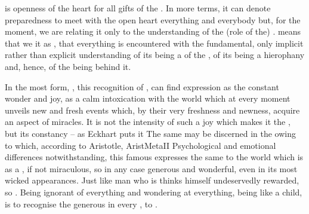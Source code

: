 \pa {} is openness of the heart for all gifts of the
. In more  terms, it can denote preparedness to meet
with the open heart everything and everybody but, for the moment, we are relating
it only to the understanding of the (role of the) .  means that we
 it as , that everything is encountered with the
fundamental, only implicit rather than explicit understanding of its being a
 of the 
, of its being a hierophany and, hence, of the  being
 behind it. 

In the most  form, , this recognition of
, can find expression as the constant wonder and joy, as a calm
intoxication with the world which at every moment unveils new and fresh events
which, by their very freshness and newness, acquire an aspect of 
miracles. It is not the intensity of such a joy which makes it the
, but its constancy -- 
as Eckhart puts it 
The same  may be discerned in the  owing to which,
according to Aristotle, \citet{men both now begin and at first began to
  philosophize.}{AristMeta}{II}  Psychological and emotional differences
notwithstanding, this famous  expresses the same
 to the world which is  as a , if not
miraculous, so in any case generous and wonderful, even in its most wicked
appearances. Just like man who is  thinks himself
undeservedly rewarded, so . Being ignorant of everything and wondering at
everything, being like a child, is to recognise the generous  in
every , to  .

